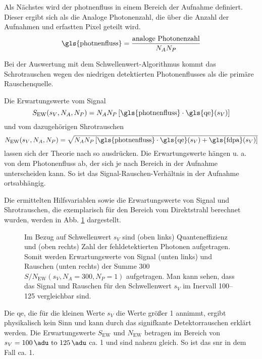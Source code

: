\noindent
Als Nächstes wird der \gls{photnenfluss} in einem Bereich der Aufnahme definiert. Dieser ergibt sich als die Analoge Photonenzahl, die über die Anzahl der Aufnahmen und erfastten Pixel geteilt wird.
\begin{equation}
    \text{\gls{photnenfluss}} = \frac{\text{analoge Photonenzahl}}{N_A N_P}
\end{equation}

\noindent
Bei der Auswertung mit dem Schwellenwert-Algorithmus kommt das Schrotrauschen wegen des niedrigen detektierten Photonenflusses als die primäre Rauschenquelle.

\noindent
Die Erwartungswerte vom Signal 
\begin{equation}
        S_{\text{EW}}(s_V, N_A, N_P) = N_{A}N_{P}\left[\text{\gls{photnenfluss}}\cdot\text{\gls{qe}}(s_V)\right]
        \label{eq:signal_ew}
\end{equation}
und vom dazugehörigen Shrotrauschen 
\begin{equation}
        N_{\text{EW}}(s_V, N_A, N_P) = \sqrt{N_{A}N_{P}\left[\text{\gls{photnenfluss}}\cdot\text{\gls{qe}}(s_V) + \text{\gls{fdpa}}(s_V)\right]}
        \label{eq:noise_ew}
\end{equation}
lassen sich der Theorie nach so ausdrücken. Die Erwartungswerte hängen u. a. von dem Photonenfluss ab, der sich je nach Bereich in der Aufnahme unterscheiden kann. So ist das Signal-Rauschen-Verhältnis in der Aufnahme ortsabhängig.  

\noindent
Die ermittelten Hilfsvariablen sowie die Erwartungswerte von Signal und Shrotrauschen, die exemplarisch für den Bereich vom Direktstrahl berechnet wurden, werden in Abb. \ref{fig:qe_fehldetektiert_signal_noise} dargestellt.
\begin{figure}[H]
    \centering
    
    \caption{Im Bezug auf Schwellenwert $s_V$ sind (oben links) Quanteneffizienz und (oben rechts) Zahl der fehldetektierten Photonen aufgetragen. Somit werden Erwartungswerte von Signal (unten links) und Rauschen (unten rechts) der Summe \SI{300}{\captures} $S/N_{\text{EW}}(s_V, N_A = 300, N_P = 1)$ aufgetragen. Man kann sehen, dass das Signal und Rauschen für den Schwellenwert $s_V$ im Inervall \qtyrange{100}{125}{\adu} vergleichbar sind.}
    \label{fig:qe_fehldetektiert_signal_noise}
\end{figure}
\noindent
Die \gls{qe}, die für die kleinen Werte $s_V$ die Werte größer \num{1} annimmt, ergibt physikalisch kein Sinn und kann durch das signifkante Detektorrauschen erklärt werden. Die Erwartungswerte $S_{\text{EW}}$ und $N_{\text{EW}}$ betragen im Bereich von $s_V = \text{\SIrange{100}{125}{\adu}}$ ca. \SI{1}{\photon} und sind nahezu gleich. So ist das \gls{snr} in dem Fall ca. 1.

